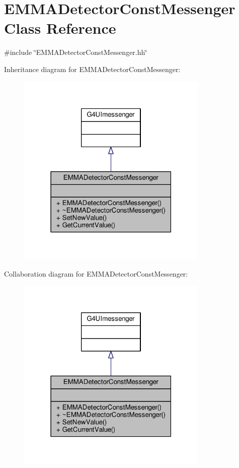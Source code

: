 \hypertarget{classEMMADetectorConstMessenger}{}\section{E\+M\+M\+A\+Detector\+Const\+Messenger Class Reference}
\label{classEMMADetectorConstMessenger}


{\ttfamily \#include \char`\"{}E\+M\+M\+A\+Detector\+Const\+Messenger.\+hh\char`\"{}}



Inheritance diagram for E\+M\+M\+A\+Detector\+Const\+Messenger\+:
\nopagebreak
\begin{figure}[H]
\begin{center}
\leavevmode
\includegraphics[width=259pt]{classEMMADetectorConstMessenger__inherit__graph}
\end{center}
\end{figure}


Collaboration diagram for E\+M\+M\+A\+Detector\+Const\+Messenger\+:
\nopagebreak
\begin{figure}[H]
\begin{center}
\leavevmode
\includegraphics[width=259pt]{classEMMADetectorConstMessenger__coll__graph}
\end{center}
\end{figure}
